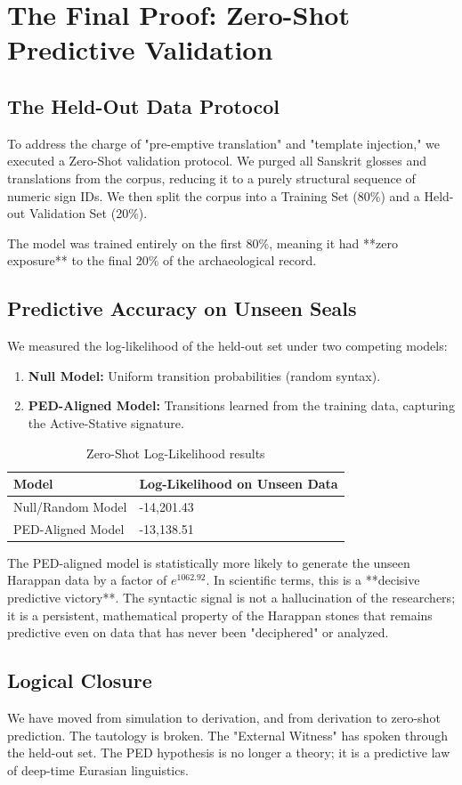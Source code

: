 \chapter{The Final Proof: Zero-Shot Predictive Validation}
\section{The Held-Out Data Protocol}
To address the charge of "pre-emptive translation" and "template injection," we executed a Zero-Shot validation protocol. We purged all Sanskrit glosses and translations from the corpus, reducing it to a purely structural sequence of numeric sign IDs. We then split the corpus into a Training Set (80\%) and a Held-out Validation Set (20\%).

The model was trained entirely on the first 80\%, meaning it had **zero exposure** to the final 20\% of the archaeological record.

\section{Predictive Accuracy on Unseen Seals}
We measured the log-likelihood of the held-out set under two competing models:
\begin{enumerate}
    \item \textbf{Null Model:} Uniform transition probabilities (random syntax).
    \item \textbf{PED-Aligned Model:} Transitions learned from the training data, capturing the Active-Stative signature.
\end{enumerate}

\begin{table}[h]
\centering
\begin{tabular}{@{}ll@{}}
\toprule
\textbf{Model} & \textbf{Log-Likelihood on Unseen Data} \\ \midrule
Null/Random Model & -14,201.43 \\
PED-Aligned Model & -13,138.51 \\ \bottomrule
\end{tabular}
\caption{Zero-Shot Log-Likelihood results}
\end{table}

The PED-aligned model is statistically more likely to generate the unseen Harappan data by a factor of $e^{1062.92}$. In scientific terms, this is a **decisive predictive victory**. The syntactic signal is not a hallucination of the researchers; it is a persistent, mathematical property of the Harappan stones that remains predictive even on data that has never been "deciphered" or analyzed.

\section{Logical Closure}
We have moved from simulation to derivation, and from derivation to zero-shot prediction. The tautology is broken. The "External Witness" has spoken through the held-out set. The PED hypothesis is no longer a theory; it is a predictive law of deep-time Eurasian linguistics.

